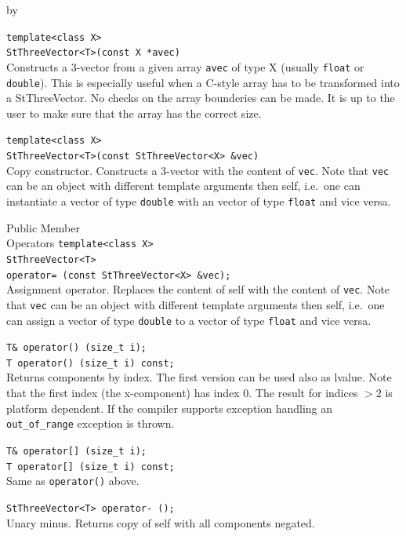 \documentclass[twoside]{article}
\newcommand{\comp}[1]{\texttt{#1}}%
\newcommand{\entrylabel}[1]{\mbox{\textbf{{#1}}}\hfil}%
\newenvironment{entry}
{\begin{list}{}%
    {\renewcommand{\makelabel}{\entrylabel}%
     \setlength{\labelwidth}{90pt}%
     \setlength{\leftmargin}{\labelwidth}
     \advance\leftmargin by \labelsep%
      }%
    }%
  {\end{list}}
\newcommand{\Entrylabel}[1]%
{\raisebox{0pt}[1ex][0pt]{\makebox[\labelwidth][l]%
    {\parbox[t]{\labelwidth}{\hspace{0pt}\textbf{{#1}}}}}}
\newenvironment{Entry}%
{\renewcommand{\entrylabel}{\Entrylabel}\begin{entry}}%
  {\end{entry}}
\begin{document}
\begin{description}
\begin{Entry}
    \verb+template<class X>+\\
    \verb+StThreeVector<T>(const X *avec)+\\
    Constructs a 3-vector from a given array \comp{avec} of type
    X (usually \comp{float} or \comp{double}).
    This is especially useful when a C-style array has to
    be transformed into a StThreeVector. 
    No checks on the array bounderies can be made.
    It is up to the user to make sure that the array
    has the correct size.
    
    \verb+template<class X>+\\
    \verb+StThreeVector<T>(const StThreeVector<X> &vec)+\\
    Copy constructor.
    Constructs a 3-vector with the content of \comp{vec}.
    Note that \comp{vec} can be an object with different
    template arguments then self, i.e.~one can instantiate
    a vector of type \comp{double} with an vector of type
    \comp{float} and vice versa.   
    
\item[Public Member\\ Operators]
    \verb+template<class X>+\\
    \verb+StThreeVector<T>+\\
    \verb+operator= (const StThreeVector<X> &vec);+ \\
    Assignment operator. Replaces the content of self with the content of \comp{vec}.
    Note that \comp{vec} can be an object with different
    template arguments then self, i.e.~one can assign
    a vector of type \comp{double} to a vector of type
    \comp{float} and vice versa.  
    
    \verb+T& operator() (size_t i);+\\
    \verb+T operator() (size_t i) const;+\\    
    Returns components by index. The first version can be used also as
    lvalue.  Note that the first index (the x-component) has index 0.
    The result for indices $> 2$ is platform dependent. If the
    compiler supports exception handling an \comp{out\_of\_range}
    exception is thrown.
    
    \verb+T& operator[] (size_t i);+\\
    \verb+T operator[] (size_t i) const;+\\
    Same as \comp{operator()} above.

    \verb+StThreeVector<T> operator- ();+\\
    Unary minus. Returns copy of self with all components negated.
    

\end{Entry}
\end{description}
\end{document}

